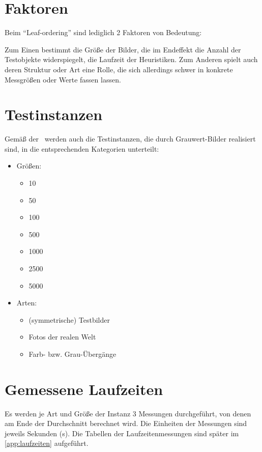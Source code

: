 \documentclass[a4paper, 10pt, twoside, onecolumn, parskip]{scrartcl}
\begin{document}
    \section{Faktoren} \label{sec:faktoren}

    Beim \enquote{Leaf-ordering} sind lediglich 2 Faktoren von Bedeutung:

    Zum Einen bestimmt die Größe der Bilder, die im Endeffekt die Anzahl der Testobjekte widerspiegelt, die Laufzeit der Heuristiken.
    Zum Anderen spielt auch deren Struktur oder Art eine Rolle, die sich allerdings schwer in konkrete Messgrößen oder Werte fassen lassen.

    \section{Testinstanzen} \label{sec:testinstanzen}

    Gemäß der~ werden auch die Testinstanzen, die durch Grauwert-Bilder realisiert sind, in die entsprechenden Kategorien unterteilt:
    \begin{itemize}
        \item Größen:
        \begin{itemize}
            \item 10
            \item 50
            \item 100
            \item 500
            \item 1000
            \item 2500
            \item 5000
        \end{itemize}
        \newpage
        \item Arten:
        \begin{itemize}
            \item (symmetrische) Testbilder
            \item Fotos der realen Welt
            \item Farb- bzw. Grau-Übergänge
        \end{itemize}
    \end{itemize}

    \section{Gemessene Laufzeiten} \label{sec:laufzeiten}

    Es werden je Art und Größe der Instanz 3 Messungen durchgeführt, von denen am Ende der Durchschnitt berechnet wird.
    Die Einheiten der Messungen sind jeweils Sekunden (s).
    Die Tabellen der Laufzeitenmessungen sind später im \autoref{app:laufzeiten} aufgeführt.
\end{document}
